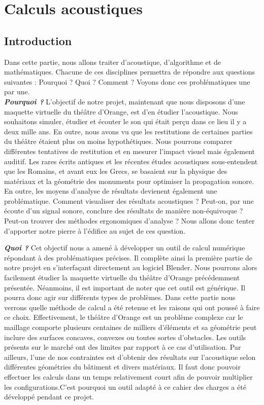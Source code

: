 \part{Calculs acoustiques}
	\chapter*{Introduction}
Dans cette partie, nous allons traiter d'acoustique, d'algorithme et de mathématiques. Chacune de ces disciplines permettra de répondre aux questions suivantes : Pourquoi ? Quoi ? Comment ? Voyons donc ces problématiques une par une.\\

\textit{\textbf{Pourquoi ?}} L'objectif de notre projet, maintenant que nous disposons d'une maquette virtuelle du théâtre d'Orange, est d'en étudier l'acoustique. Nous souhaitons simuler, étudier et écouter le son qui était perçu dans ce lieu il y a deux mille ans. En outre, nous avons vu que les restitutions de certaines parties du théâtre étaient plus ou moins hypothétiques. Nous pourrons comparer différentes tentatives de restitution et en mesurer l'impact visuel mais également auditif. Les rares écrits antiques et les récentes études acoustiques sous-entendent que les Romains, et avant eux les Grecs, se basaient sur la physique des matériaux et la géométrie des monuments pour optimiser la propagation sonore. En outre, les moyens d'analyse de résultats devienent également une problématique. Comment visualiser des résultats acoustiques ? Peut-on, par une écoute d'un signal sonore, conclure des résultats de manière non-équivoque ? Peut-on trouver des méthodes ergonomiques d'analyse ? Nous allons donc tenter d'apporter notre pierre à l'édifice au sujet de ces question. 

\textit{\textbf{Quoi ?}} Cet objectif nous a amené à développer un outil de calcul numérique répondant à des problématiques précises. Il complète ainsi la première partie de notre projet en s'interfaçant directement au logiciel Blender. Nous pourrons alors facilement étudier la maquette virtuelle du théâtre d'Orange précédemment présentée. Néanmoins, il est important de noter que cet outil est générique. Il pourra donc agir sur différents types de problèmes. Dans cette partie nous verrons quelle méthode de calcul a été retenue et les raisons qui ont poussé à faire ce choix. Effectivement, le théâtre d'Orange est un problème complexe car le maillage comporte plusieurs centaines de milliers d'éléments et sa géométrie peut inclure des surfaces concaves, convexes ou toutes sortes d'obstacles. Les outils présents sur le marché ont des limites par rapport à ce cas d'utilisation. Par ailleurs, l'une de nos contraintes est d'obtenir des résultats sur l'acoustique selon différentes géométries du bâtiment et divers matériaux. Il faut donc pouvoir effectuer les calculs dans un temps relativement court afin de pouvoir multiplier les configurations.C'est pourquoi un outil adapté à ce cahier des charges a été développé pendant ce projet.


